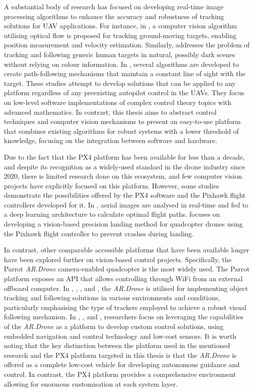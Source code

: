 A substantial body of research has focused on developing real-time image processing algorithms to enhance the accuracy and robustness of tracking solutions for UAV applications. For instance, in \cite{gomez-balderas2012}, a computer vision algorithm utilising optical flow is proposed for tracking ground-moving targets, enabling position measurement and velocity estimation. Similarly, \cite{bevilacqua2016} addresses the problem of tracking and following generic human targets in natural, possibly dark scenes without relying on colour information. In \cite{rysdyk2003}, several algorithms are developed to create path-following mechanisms that maintain a constant line of sight with the target. These studies attempt to develop solutions that can be applied to any platform regardless of any preexisting autopilot control in the UAVs.
They focus on low-level software implementations of complex control theory topics with advanced mathematics.
In contrast, this thesis aims to abstract control techniques and computer vision mechanisms to present an easy-to-use platform that combines existing algorithms for robust systems with a lower threshold of knowledge, focusing on the integration between software and hardware.

Due to the fact that the PX4 platform has been available for less than a decade, and despite its recognition as a widely-used standard in the drone industry since 2020, there is limited research done on this ecosystem, and few computer vision projects have explicitly focused on this platform. However, some studies demonstrate the possibilities offered by the PX4 software and the Pixhawk flight controllers developed for it. In \cite{sizkouhi2022}, aerial images are analysed in real-time and fed to a deep learning architecture to calculate optimal flight paths. \cite{naufal2022} focuses on developing a vision-based precision landing method for quadcopter drones using the Pixhawk flight controller to prevent crashes during landing.

In contrast, other comparable accessible platforms that have been available longer have been explored further on vision-based control projects. Specifically, the Parrot \emph{AR.Drone} camera-enabled quadcopter is the most widely used. The Parrot platform exposes an API that allows controlling through WiFi from an external offboard computer.
In \cite{bartak2015}, \cite{chakrabarty2016}, \cite{pestana2013}, and \cite{haag2015}, the \emph{AR.Drone} is utilised for implementing object tracking and following solutions in various environments and conditions, particularly emphasising the type of trackers employed to achieve a robust visual following mechanism. 
In \cite{hernandez2013}, \cite{lugo2014}, and \cite{bristeau2011}, researchers focus on leveraging the capabilities of the \emph{AR.Drone} as a platform to develop custom control solutions, using embedded navigation and control technology and low-cost sensors. It is worth noting that the key distinction between the platform used in the mentioned research and the PX4 platform targeted in this thesis is that the \emph{AR.Drone} is offered as a complete low-cost vehicle for developing autonomous guidance and control. In contrast, the PX4 platform provides a comprehensive environment allowing for enormous customisation at each system layer.


